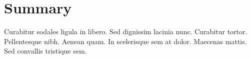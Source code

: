 
\chapter*{Summary}
\thispagestyle{empty}

Curabitur sodales ligula in libero. Sed dignissim lacinia nunc. Curabitur tortor. Pellentesque nibh. Aenean quam. In scelerisque sem at dolor. Maecenas mattis. Sed convallis tristique sem.

